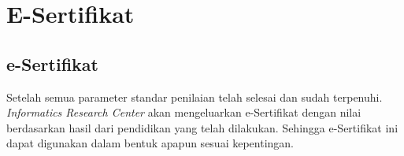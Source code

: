 \chapter{E-Sertifikat}

\section{e-Sertifikat}
Setelah semua parameter standar penilaian telah selesai dan sudah terpenuhi. \textit{Informatics Research Center} akan mengeluarkan e-Sertifikat dengan nilai berdasarkan hasil dari pendidikan yang telah dilakukan. Sehingga e-Sertifikat ini dapat digunakan dalam bentuk apapun sesuai kepentingan.